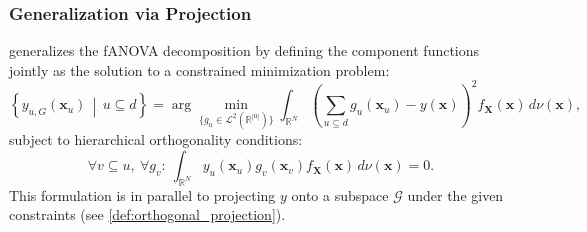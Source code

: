 \subsubsection{Generalization via Projection}
\cite{hooker2007} generalizes the fANOVA decomposition by defining the component 
functions jointly as the solution to a constrained minimization problem:
\begin{equation}
\left\{ y_{u, G}(\boldsymbol{x}_u) \,\middle|\, u \subseteq d \right\}
= \arg\min_{\{g_u \in \mathcal{L}^2(\mathbb{R}^{|u|})\}} 
\int_{\mathbb{R}^N} \left( \sum_{u \subseteq d} g_u(\boldsymbol{x}_u) - y(\boldsymbol{x}) \right)^2 
f_{\boldsymbol{X}}(\boldsymbol{x}) \, d \nu (\boldsymbol{x}),
\label{eq:generalized_fanova_components_hooker}
\end{equation}
subject to hierarchical orthogonality conditions:
\begin{equation}
    \forall v \subseteq u,\ \forall g_v:\ 
    \int_{\mathbb{R}^N} y_u(\boldsymbol{x}_u) g_v(\boldsymbol{x}_v) 
    f_{\boldsymbol{X}}(\boldsymbol{x}) \, d \nu (\boldsymbol{x}) = 0.
\label{eq:hooker_hierarchical_orthogonality}
\end{equation}
This formulation is in parallel to projecting $y$ onto a subspace 
$\mathcal{G}$ under the given constraints (see \autoref{def:orthogonal_projection}).\par

